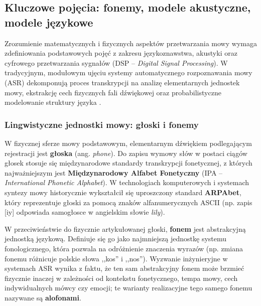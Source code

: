 \subsection{Kluczowe pojęcia: fonemy, modele akustyczne, modele językowe}
Zrozumienie matematycznych i fizycznych aspektów przetwarzania mowy wymaga zdefiniowania podstawowych pojęć z zakresu językoznawstwa, akustyki oraz cyfrowego przetwarzania sygnałów (DSP -- \textit{Digital Signal Processing}). W tradycyjnym, modułowym ujęciu systemy automatycznego rozpoznawania mowy (ASR) dekomponują proces transkrypcji na analizę elementarnych jednostek mowy, ekstrakcję cech fizycznych fali dźwiękowej oraz probabilistyczne modelowanie struktury języka \cite[s.~315--316]{pondel2024e2e}.

\subsubsection{Lingwistyczne jednostki mowy: głoski i fonemy}
W fizycznej sferze mowy podstawowym, elementarnym dźwiękiem podlegającym rejestracji jest \textbf{głoska} (ang. \textit{phone}). Do zapisu wymowy słów w postaci ciągów głosek stosuje się międzynarodowe standardy transkrypcji fonetycznej, z których najważniejszym jest \textbf{Międzynarodowy Alfabet Fonetyczny} (IPA -- \textit{International Phonetic Alphabet}). W technologiach komputerowych i systemach syntezy mowy historycznie wykształcił się uproszczony standard \textbf{ARPAbet}, który reprezentuje głoski za pomocą znaków alfanumerycznych ASCII (np. zapis [iy] odpowiada samogłosce w angielskim słowie \textit{lily}).

W przeciwieństwie do fizycznie artykułowanej głoski, \textbf{fonem} jest abstrakcyjną jednostką językową. Definiuje się go jako najmniejszą jednostkę systemu fonologicznego, która pozwala na odróżnienie znaczenia wyrazów (np. zmiana fonemu różnicuje polskie słowa ,,kos'' i ,,nos''). Wyzwanie inżynieryjne w systemach ASR wynika z faktu, że ten sam abstrakcyjny fonem może brzmieć fizycznie inaczej w zależności od kontekstu fonetycznego, tempa mowy, cech indywidualnych mówcy czy emocji; te warianty realizacyjne tego samego fonemu nazywane są \textbf{alofonami}.
